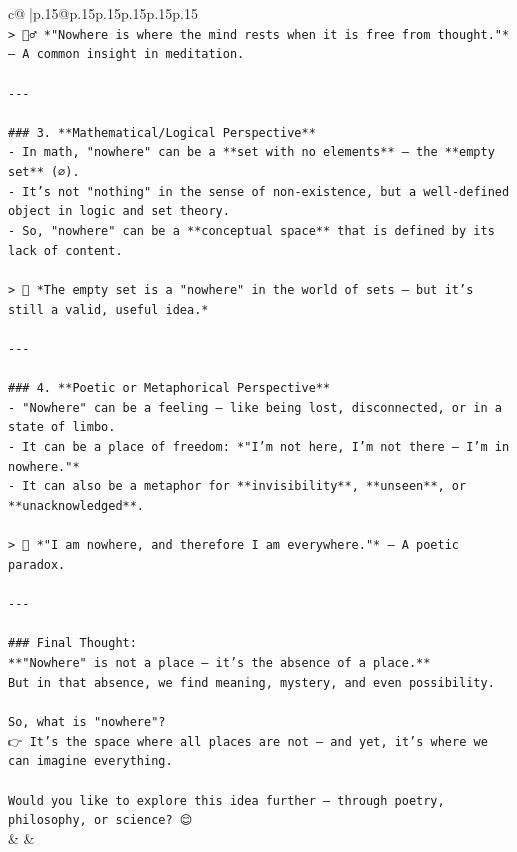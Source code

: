 \documentclass{article}
\begin{document}
{\begin{supertabular}{c@{$\;$}|p{.15\linewidth}@{}p{.15\linewidth}p{.15\linewidth}p{.15\linewidth}p{.15\linewidth}p{.15\linewidth}}
{{{\\ 
\texttt{> 🧘‍♂️ *"Nowhere is where the mind rests when it is free from thought."* — A common insight in meditation.} \\
\\ 
\texttt{{-}{-}{-}} \\
\\ 
\texttt{\#\#\# 3. **Mathematical/Logical Perspective**} \\
\texttt{{-} In math, "nowhere" can be a **set with no elements** — the **empty set** (∅).} \\
\texttt{{-} It’s not "nothing" in the sense of non{-}existence, but a well{-}defined object in logic and set theory.} \\
\texttt{{-} So, "nowhere" can be a **conceptual space** that is defined by its lack of content.} \\
\\ 
\texttt{> 📐 *The empty set is a "nowhere" in the world of sets — but it’s still a valid, useful idea.*} \\
\\ 
\texttt{{-}{-}{-}} \\
\\ 
\texttt{\#\#\# 4. **Poetic or Metaphorical Perspective**} \\
\texttt{{-} "Nowhere" can be a feeling — like being lost, disconnected, or in a state of limbo.} \\
\texttt{{-} It can be a place of freedom: *"I’m not here, I’m not there — I’m in nowhere."*} \\
\texttt{{-} It can also be a metaphor for **invisibility**, **unseen**, or **unacknowledged**.} \\
\\ 
\texttt{> 🌌 *"I am nowhere, and therefore I am everywhere."* — A poetic paradox.} \\
\\ 
\texttt{{-}{-}{-}} \\
\\ 
\texttt{\#\#\# Final Thought:} \\
\texttt{**"Nowhere" is not a place — it’s the absence of a place.**  } \\
\texttt{But in that absence, we find meaning, mystery, and even possibility.} \\
\\ 
\texttt{So, what is "nowhere"?  } \\
\texttt{👉 It’s the space where all places are not — and yet, it’s where we can imagine everything.} \\
\\ 
\texttt{Would you like to explore this idea further — through poetry, philosophy, or science? 😊} \\
            }
        }
    }
    & & \\ \\


\end{supertabular}}
\end{document}
